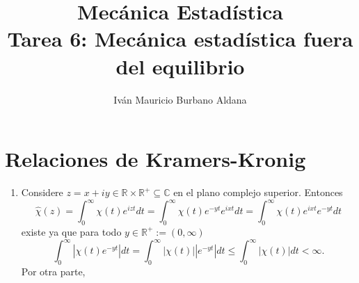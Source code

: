 \documentclass{article}
\title{Mecánica Estadística\\
Tarea 6: Mecánica estadística fuera del equilibrio}
\author{Iván Mauricio Burbano Aldana}
\begin{document}
\maketitle

\section{Relaciones de Kramers-Kronig}

\begin{enumerate}

\item Considere $z=x+iy\in\mathbb{R}\times\mathbb{R}^+\subseteq\mathbb{C}$ en el plano complejo superior. Entonces
\begin{equation}
\hat{\chi}(z)=\int_0^\infty\chi(t)e^{izt}dt=\int_0^\infty\chi(t)e^{-yt}e^{ixt}dt=\int_0^\infty\chi(t)e^{ixt}e^{-yt}dt
\end{equation} 
existe ya que para todo $y\in\mathbb{R}^+:=(0,\infty)$
\begin{equation}
\int_0 ^\infty |\chi(t)e^{-yt}| dt=\int_0 ^\infty |\chi(t)||e^{-yt}| dt\leq\int_0 ^\infty |\chi(t)| dt<\infty.
\end{equation}
Por otra parte, 

\end{enumerate}
\end{document}
